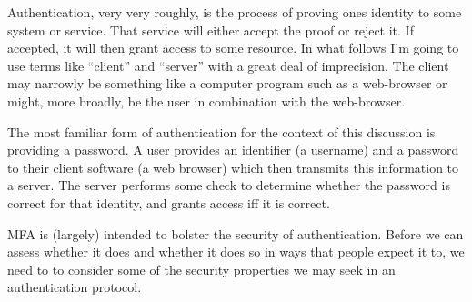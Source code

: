 \documentclass[12pt]{article}
\begin{document}
Authentication, very very roughly, is the process of proving ones identity to some system or service.
That service will either accept the proof or reject it.
If accepted, it will then grant access to some resource. In what follows I'm going to use terms like ``client'' and ``server'' with a great deal of imprecision. The client may narrowly be something like a computer program such as a web-browser or might, more broadly, be the user in combination with the web-browser.

The most familiar form of authentication for the context of this discussion is providing a password. A user provides an identifier (a username) and a password to their client software (a web browser) which then transmits this information to a server. The server performs some check to determine whether the password is correct for that identity, and grants access iff it is correct.

MFA is (largely) intended to bolster the security of authentication.
Before we can assess whether it does and whether it does so in ways that people expect it to,
we need to to consider some of the security properties we may seek in an authentication protocol.
\end{document}
